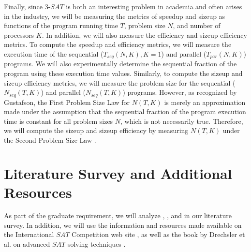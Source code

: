 \documentclass[paper=a4, fontsize=11pt]{scrartcl} %
\begin{document}
Finally, since $3$-$SAT$ is both an interesting problem in academia and often arises in 
the industry, we will be measuring the metrics of speedup and sizeup as functions
of the program running time $T$, problem size $N$, and number of processors $K$. In addition, we will also measure 
the efficiency and sizeup efficiency metrics. To compute the speedup and efficiency metrics, we will
measure the execution time of the sequential ($T_{seq}(N,K), K = 1$) and parallel ($T_{par}(N,K)$) programs. We will also experimentally determine the sequential fraction of 
the program using these execution time values. Similarly, to compute the sizeup and sizeup efficiency metrics,
we will measure the problem size for the sequential ($N_{seq}(T,K)$) and parallel ($N_{seq}(T,K)$)
programs. However, as recognized by Gustafson, the First Problem Size Law for $N(T,K)$ is
merely an approximation made under the assumption that the sequential fraction 
of the program execution time is constant for all problem sizes $N$, which is not necessarily true. Therefore, we 
will compute the sizeup and sizeup efficiency by measuring $N(T,K)$ under the Second Problem Size Law \cite{parallelComputing}.

\section{Literature Survey and Additional Resources}
As part of the graduate requirement, we will analyze \cite{paper1}, \cite{paper2},
and \cite{paper3} in our literature survey. In addition, we will use the information and resources made available
on the International $SAT$ Competition web site \cite{satCompetition}, as well
as the book by Drechsler et al. on advanced $SAT$ solving techniques \cite{satBook}. 

\end{document}
